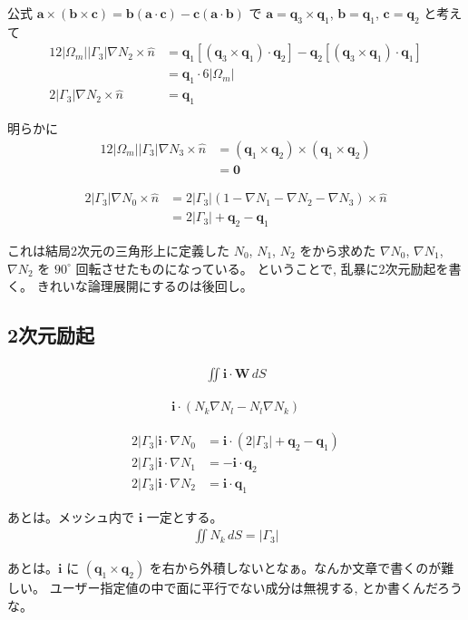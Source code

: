 公式
$\bm{a}\times\left(\bm{b}\times\bm{c}\right)
=\bm{b}\left(\bm{a}\cdot\bm{c}\right)
-\bm{c}\left(\bm{a}\cdot\bm{b}\right)$
で
$\bm{a}=\bm{q}_3\times\bm{q}_1$, $\bm{b}=\bm{q}_1$, $\bm{c}=\bm{q}_2$
と考えて
\begin{align}
12\left|\Omega_m\right|\left|\Gamma_3\right|\nabla N_2\times\hat{n}
&=\bm{q}_1\left[\left(\bm{q}_3\times\bm{q}_1\right)\cdot\bm{q}_2\right]
 -\bm{q}_2\left[\left(\bm{q}_3\times\bm{q}_1\right)\cdot\bm{q}_1\right]\\
&=\bm{q}_1\cdot6\left|\Omega_m\right|\\
2\left|\Gamma_3\right|\nabla N_2\times\hat{n}
&=\bm{q}_1
\end{align}

明らかに
\begin{align}
12\left|\Omega_m\right|\left|\Gamma_3\right|\nabla N_3\times\hat{n}
&=\left(\bm{q}_1\times\bm{q}_2\right)\times\left(\bm{q}_1\times\bm{q}_2\right)\\
&=\bm{0}
\end{align}

\begin{align}
2\left|\Gamma_3\right|\nabla N_0\times\hat{n}
&=2\left|\Gamma_3\right|
 \left(1-\nabla N_1-\nabla N_2-\nabla N_3\right)\times\hat{n}\\
&=2\left|\Gamma_3\right|+\bm{q}_2-\bm{q}_1
\end{align}

これは結局2次元の三角形上に定義した $N_0$, $N_1$, $N_2$
をから求めた $\nabla N_0$, $\nabla N_1$, $\nabla N_2$
を $90^\circ$ 回転させたものになっている。
ということで, 乱暴に2次元励起を書く。
きれいな論理展開にするのは後回し。

\subsection{2次元励起}

\begin{align}
\iint\bm{i}\cdot\bm{W}\,dS
\end{align}

\begin{align}
\bm{i}\cdot\left(N_k\nabla N_l-N_l\nabla N_k\right)
\end{align}

\begin{align}
2\left|\Gamma_3\right|\bm{i}\cdot\nabla N_0
&=\bm{i}\cdot\left(2\left|\Gamma_3\right|+\bm{q}_2-\bm{q}_1\right)\\
2\left|\Gamma_3\right|\bm{i}\cdot\nabla N_1
&=-\bm{i}\cdot\bm{q}_2\\
2\left|\Gamma_3\right|\bm{i}\cdot\nabla N_2
&=\bm{i}\cdot\bm{q}_1
\end{align}

あとは。メッシュ内で $\bm{i}$ 一定とする。
\begin{align}
\iint N_k\,dS = \left|\Gamma_3\right|
\end{align}

あとは。$\bm{i}$ に $\left(\bm{q}_1\times\bm{q}_2\right)$
を右から外積しないとなぁ。なんか文章で書くのが難しい。
ユーザー指定値の中で面に平行でない成分は無視する,
とか書くんだろうな。